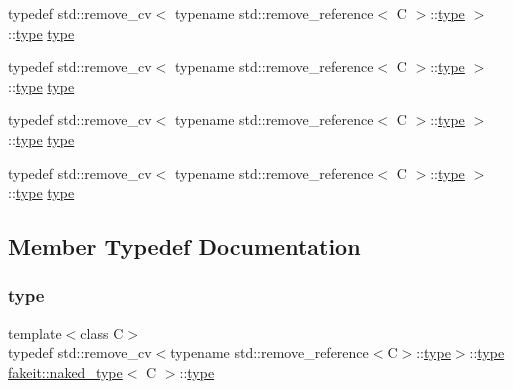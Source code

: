 \begin{DoxyCompactItemize}
\item 
typedef std\+::remove\+\_\+cv$<$ typename std\+::remove\+\_\+reference$<$ C $>$\+::\mbox{\hyperlink{structfakeit_1_1naked__type_a3248a6c417c3a06d6e93576085fe7fcc}{type}} $>$\+::\mbox{\hyperlink{structfakeit_1_1naked__type_a3248a6c417c3a06d6e93576085fe7fcc}{type}} \mbox{\hyperlink{structfakeit_1_1naked__type_a3248a6c417c3a06d6e93576085fe7fcc}{type}}
\item 
typedef std\+::remove\+\_\+cv$<$ typename std\+::remove\+\_\+reference$<$ C $>$\+::\mbox{\hyperlink{structfakeit_1_1naked__type_a3248a6c417c3a06d6e93576085fe7fcc}{type}} $>$\+::\mbox{\hyperlink{structfakeit_1_1naked__type_a3248a6c417c3a06d6e93576085fe7fcc}{type}} \mbox{\hyperlink{structfakeit_1_1naked__type_a3248a6c417c3a06d6e93576085fe7fcc}{type}}
\item 
typedef std\+::remove\+\_\+cv$<$ typename std\+::remove\+\_\+reference$<$ C $>$\+::\mbox{\hyperlink{structfakeit_1_1naked__type_a3248a6c417c3a06d6e93576085fe7fcc}{type}} $>$\+::\mbox{\hyperlink{structfakeit_1_1naked__type_a3248a6c417c3a06d6e93576085fe7fcc}{type}} \mbox{\hyperlink{structfakeit_1_1naked__type_a3248a6c417c3a06d6e93576085fe7fcc}{type}}
\item 
typedef std\+::remove\+\_\+cv$<$ typename std\+::remove\+\_\+reference$<$ C $>$\+::\mbox{\hyperlink{structfakeit_1_1naked__type_a3248a6c417c3a06d6e93576085fe7fcc}{type}} $>$\+::\mbox{\hyperlink{structfakeit_1_1naked__type_a3248a6c417c3a06d6e93576085fe7fcc}{type}} \mbox{\hyperlink{structfakeit_1_1naked__type_a3248a6c417c3a06d6e93576085fe7fcc}{type}}
\end{DoxyCompactItemize}


\subsection{Member Typedef Documentation}
\mbox{\label{structfakeit_1_1naked__type_a3248a6c417c3a06d6e93576085fe7fcc}} 
\subsubsection{\texorpdfstring{type}{type}\hspace{0.1cm}{\footnotesize\ttfamily [1/9]}}
{\footnotesize\ttfamily template$<$class C$>$ \\
typedef std\+::remove\+\_\+cv$<$typename std\+::remove\+\_\+reference$<$C$>$\+::\mbox{\hyperlink{structfakeit_1_1naked__type_a3248a6c417c3a06d6e93576085fe7fcc}{type}}$>$\+::\mbox{\hyperlink{structfakeit_1_1naked__type_a3248a6c417c3a06d6e93576085fe7fcc}{type}} \mbox{\hyperlink{structfakeit_1_1naked__type}{fakeit\+::naked\+\_\+type}}$<$ C $>$\+::\mbox{\hyperlink{structfakeit_1_1naked__type_a3248a6c417c3a06d6e93576085fe7fcc}{type}}}

